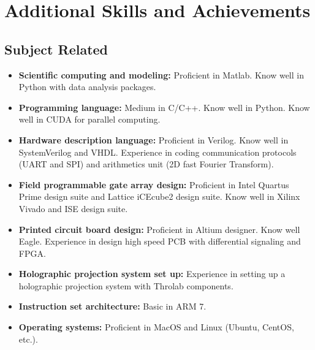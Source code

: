 \documentclass[11pt,a4paper,roman]{moderncv}        %
\begin{document}
\section{Additional Skills and Achievements}
\subsection{Subject Related}
\begin{itemize}
	\item \textbf{Scientific computing and modeling:} Proficient in Matlab. Know well in Python with data analysis packages.
	\item \textbf{Programming language:} Medium in C/C++. Know well in Python. Know well in CUDA for parallel computing.
	\item \textbf{Hardware description language:} Proficient in Verilog. Know well in SystemVerilog and VHDL. Experience in coding communication protocols (UART and SPI) and arithmetics unit (2D fast Fourier Transform).
	\item \textbf{Field programmable gate array design:} Proficient in Intel Quartus Prime design suite and Lattice iCEcube2 design suite. Know well in Xilinx Vivado and ISE design suite.
	\item \textbf{Printed circuit board design:} Proficient in Altium designer. Know well Eagle. Experience in design high speed PCB with differential signaling and FPGA.
	\item \textbf{Holographic projection system set up:} Experience in setting up a holographic projection system with Throlab components.
	\item \textbf{Instruction set architecture:} Basic in ARM 7.
	\item \textbf{Operating systems:} Proficient in MacOS and Linux (Ubuntu, CentOS, etc.).
\end{itemize}
\end{document}
